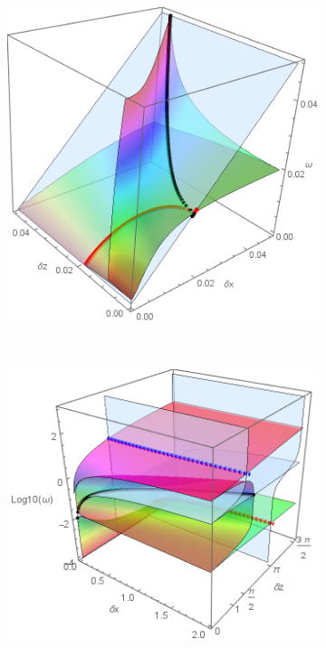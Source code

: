 \documentclass[a4paper,11pt]{article}
\begin{document}
\begin{figure}[!h]
	\begin{subfigure}{0.45\linewidth}
		\includegraphics[width=1\linewidth]{FIGURES/Fig_Inter_All_zoom5.png}
		\caption{}
	\end{subfigure}
	~
	\begin{subfigure}{0.45\linewidth}
		\includegraphics[width=1\linewidth]{FIGURES/Disp_Full_all.png}
		\caption{}
	\end{subfigure}


\end{figure}
\end{document}
